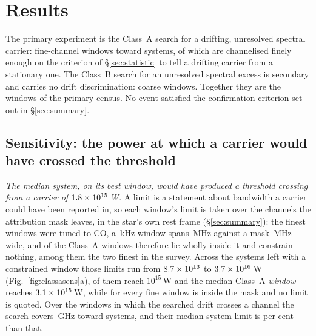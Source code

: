 \section{Results}
\label{sec:results}

The primary experiment is the Class~A search for a drifting, unresolved
spectral carrier: \NWinA{} fine-channel windows toward \NSysClassA{} systems,
\EdrNWinA{} of which are channelised finely enough on the criterion of
\S\ref{sec:statistic} to tell a drifting carrier from a stationary one. The
Class~B search for an unresolved spectral excess is secondary and carries no
drift discrimination: \NWinB{} coarse windows. Together they are the
\NWindows{} windows of the primary census. No event satisfied the confirmation
criterion set out in \S\ref{sec:summary}.

\subsection{Sensitivity: the power at which a carrier would have crossed
the threshold} \label{sec:pninetysel}

\emph{The median system, on its best window, would have produced a threshold
crossing from a carrier of $1.8\times10^{15}$\,W.} A limit is a statement
about bandwidth a carrier could have been reported in, so each window's limit
is taken over the channels the attribution mask leaves, in the star's own rest
frame (\S\ref{sec:summary}): the finest windows were tuned to CO, a
\UmFineChanKHz\,kHz window spans \UmFineBwMHz\,MHz against a mask
\UmFineMaskMHz\,MHz wide, and \UmNWinAFull{} of the \NWinA{} Class~A windows
therefore lie wholly inside it and constrain nothing, among them the two finest
in the survey. Across the \NSysALim{} systems left with a constrained window
those limits run from $8.7\times10^{13}$ to $3.7\times10^{16}$\,W
(Fig.~\ref{fig:classasens}a), \NSysEfifteen{} of them reach $10^{15}$\,W and
the median Class~A \emph{window} reaches $3.1\times10^{15}$\,W, while for
\NSysALostName{} every fine window is inside the mask and no limit is quoted.
Over the \EdrNWinA{} windows in which the searched drift crosses a channel the
search covers \EdrUnionGHz\,GHz toward \EdrNSys{} systems, and their median
system limit is \ScEdrMedPct{} per cent \ScEdrMedSense{} than that.

